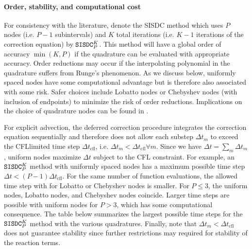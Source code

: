 \documentclass[letterpaper,10pt,english]{sphinxmanual}
\begin{document}
\paragraph{Order, stability, and computational cost}
\label{\detokenize{MinimalPlasmaModel:order-stability-and-computational-cost}}
For consistency with the literature, denote the SISDC method which uses \(P\) nodes (i.e. \(P-1\) subintervals) and \(K\) total iterations (i.e. \(K-1\) iterations of the correction equation) by \(\verb|SISDC|_P^K\). This method will have a global order of accuracy \(\min\left(K,P\right)\) if the quadrature can be evaluated with appropriate accuracy. Order reductions may occur if the interpolating polynomial in the quadrature suffers from Runge’s phenomenon. As we discuss below, uniformly spaced nodes have some computational advantage but is therefore also associated with some risk. Safer choices include Lobatto nodes or Chebyshev nodes (with inclusion of endpoints) to minimize the risk of order reductions. Implications on the choice of quadrature nodes can be found in .

For explicit advection, the deferred correction procedure integrates the correction equation sequentially and therefore does not allow each substep \(\Delta t_m\) to exceed the CFL\sphinxhyphen{}limited time step \(\Delta t_{\textrm{cfl}}\), i.e. \(\Delta t_m < \Delta t_{\textrm{cfl}} \forall m\). Since we have \(\Delta t = \sum_m\Delta t_m\), uniform nodes maximize \(\Delta t\) subject to the CFL constraint. For example, an \(\verb|SISDC|_P^K\) method with uniformly spaced nodes has a maximum possible time step \(\Delta t < (P-1)\Delta t_{\textrm{cfl}}\). For the same number of function evaluations, the allowed time step with for Lobatto or Chebyshev nodes is smaller. For \(P\leq 3\), the uniform nodes, Lobatto nodes, and Chebyshev nodes coincide. Larger time steps are possible with uniform nodes for \(P>3\), which has some computational consequence. The table below summarizes the largest possible time steps for the \(\verb|SISDC|_P^K\) method with the various quadratures. Finally, note that \(\Delta t_m < \Delta t_{\textrm{cfl}}\) does not guarantee stability since further restrictions may required for stability of the reaction terms.
\end{document}
